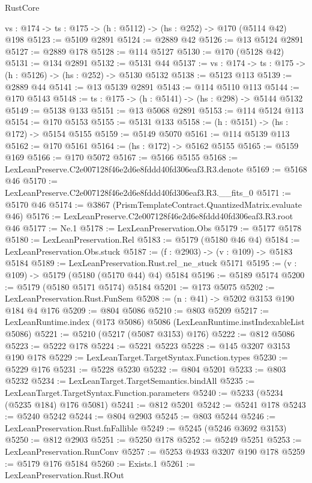 \begin{lexlean}{RustCore}
\begin{coremodule}
  {vs : @174} -> {ts : @175} -> (h : @5112) -> (hs : @252) -> @170 (@5114 @42) @198
@5123 := @5109 @2891
@5124 := @2889 @42
@5126 := @13 @5124 @2891
@5127 := @2889 @178
@5128 := @114 @5127
@5130 := @170 (@5128 @42)
@5131 := @134 @2891
@5132 := @5131 @44
@5137 := {vs : @174} -> {ts : @175} -> (h : @5126) -> (hs : @252) -> @5130 @5132
@5138 := @5123 @113
@5139 := @2889 @44
@5141 := @13 @5139 @2891
@5143 := @114 @5110 @113
@5144 := @170 @5143
@5148 := {ts : @175} -> (h : @5141) -> (hs : @298) -> @5144 @5132
@5149 := @5138 @133
@5151 := @13 @5068 @2891
@5153 := @114 @5124 @113
@5154 := @170 @5153
@5155 := @5131 @133
@5158 := (h : @5151) -> (hs : @172) -> @5154 @5155
@5159 := @5149 @5070
@5161 := @114 @5139 @113
@5162 := @170 @5161
@5164 := (hs : @172) -> @5162 @5155
@5165 := @5159 @169
@5166 := @170 @5072
@5167 := @5166 @5155
@5168 := LexLeanPreserve.C2e007128f46e2d6e8fddd40fd306eaf3.R3.denote
@5169 := @5168 @46
@5170 := LexLeanPreserve.C2e007128f46e2d6e8fddd40fd306eaf3.R3.__fits_0
@5171 := @5170 @46
@5174 := @3867 (PrismTemplateContract.QuantizedMatrix.evaluate @46)
@5176 := LexLeanPreserve.C2e007128f46e2d6e8fddd40fd306eaf3.R3.root @46
@5177 := Ne.{1}
@5178 := LexLeanPreservation.Obs
@5179 := @5177 @5178
@5180 := LexLeanPreservation.Rel
@5183 := @5179 (@5180 @46 @4)
@5184 := LexLeanPreservation.Obs.stuck
@5187 := (f : @2903) -> (v : @109) -> @5183 @5184
@5189 := LexLeanPreservation.Rust.rel_ne_stuck @5171
@5195 := (v : @109) -> @5179 (@5180 (@5170 @44) @4) @5184
@5196 := @5189 @5174
@5200 := @5179 (@5180 @5171 @5174) @5184
@5201 := @173 @5075
@5202 := LexLeanPreservation.Rust.FunSem
@5208 := (n : @41) -> @5202 @3153 @190 @184 @4 @176
@5209 := @804 @5086
@5210 := @803 @5209
@5217 := LexLeanRuntime.index (@173 @5086) @5086 (LexLeanRuntime.instIndexableList @5086)
@5221 := @5210 (@5217 (@5087 @3153) @176)
@5222 := @812 @5086
@5223 := @5222 @178
@5224 := @5221 @5223
@5228 := @145 @3207 @3153 @190 @178
@5229 := LexLeanTarget.TargetSyntax.Function.types
@5230 := @5229 @176
@5231 := @5228 @5230
@5232 := @804 @5201
@5233 := @803 @5232
@5234 := LexLeanTarget.TargetSemantics.bindAll
@5235 := LexLeanTarget.TargetSyntax.Function.parameters
@5240 := @5233 (@5234 (@5235 @184) @176 @5081)
@5241 := @812 @5201
@5242 := @5241 @178
@5243 := @5240 @5242
@5244 := @804 @2903
@5245 := @803 @5244
@5246 := LexLeanPreservation.Rust.fnFallible
@5249 := @5245 (@5246 @3692 @3153)
@5250 := @812 @2903
@5251 := @5250 @178
@5252 := @5249 @5251
@5253 := LexLeanPreservation.RunConv
@5257 := @5253 @4933 @3207 @190 @178
@5259 := @5179 @176 @5184
@5260 := Exists.{1}
@5261 := LexLeanPreservation.Rust.ROut

\end{coremodule}
\end{lexlean}
